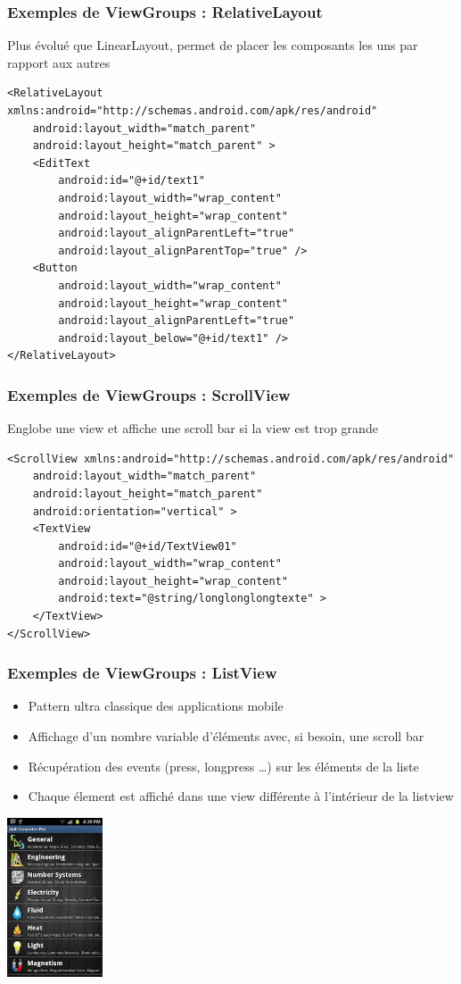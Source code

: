 \documentclass{beamer}
\begin{document}
\begin{frame}[fragile]
\frametitle{Exemples de ViewGroups : RelativeLayout}
Plus évolué que LinearLayout, permet de placer les composants les uns par rapport aux autres
\begin{lstlisting}
<RelativeLayout xmlns:android="http://schemas.android.com/apk/res/android"
    android:layout_width="match_parent"
    android:layout_height="match_parent" >
    <EditText
    	android:id="@+id/text1"
        android:layout_width="wrap_content"
        android:layout_height="wrap_content"
        android:layout_alignParentLeft="true"
        android:layout_alignParentTop="true" />
    <Button
        android:layout_width="wrap_content"
        android:layout_height="wrap_content"
        android:layout_alignParentLeft="true"
        android:layout_below="@+id/text1" />
</RelativeLayout> 
\end{lstlisting}
\end{frame}
\begin{frame}[fragile]
\frametitle{Exemples de ViewGroups : ScrollView}
Englobe une view et affiche une scroll bar si la view est trop grande
\begin{lstlisting}
<ScrollView xmlns:android="http://schemas.android.com/apk/res/android"
    android:layout_width="match_parent"
    android:layout_height="match_parent"
    android:orientation="vertical" >
    <TextView
        android:id="@+id/TextView01"
        android:layout_width="wrap_content"
        android:layout_height="wrap_content"
        android:text="@string/longlonglongtexte" >
    </TextView>
</ScrollView> 
\end{lstlisting}
\end{frame}
\begin{frame}[fragile]
\frametitle{Exemples de ViewGroups : ListView}
\begin{itemize}
  \item Pattern ultra classique des applications mobile
  \item Affichage d'un nombre variable d'éléments avec, si besoin, une scroll bar
  \item Récupération des events (press, longpress \ldots) sur les éléments de la liste
  \item Chaque élement est affiché dans une view différente à l'intérieur de la listview
\end{itemize}
\includegraphics[width=80pt]{img/listview.jpg}
\end{frame}
\end{document}
